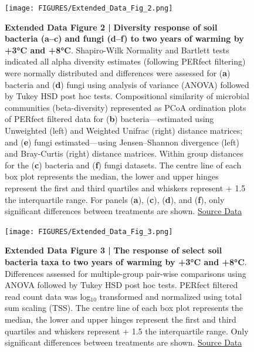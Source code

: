 \documentclass[
  letterpaper,
  DIV=11,
  numbers=noendperiod]{scrartcl}
\begin{document}
\begin{figure}

{\centering \texttt{[image: FIGURES/Extended\_Data\_Fig\_2.png]}

}

\caption{\textbf{Extended Data Figure 2 |}
\textbf{Diversity response of soil bacteria (a--c) and fungi (d--f) to two years of warming by +3°C and +8°C}.
Shapiro-Wilk Normality and Bartlett tests indicated all alpha diversity
estimates (following PERfect filtering) were normally distributed and
differences were assessed for (\textbf{a}) bacteria and (\textbf{d})
fungi using analysis of variance (ANOVA) followed by Tukey HSD post hoc
tests. Compositional similarity of microbial communities
(beta-diversity) represented as PCoA ordination plots of PERfect
filtered data for (\textbf{b}) bacteria---estimated using Unweighted
(left) and Weighted Unifrac (right) distance matrices; and (\textbf{e})
fungi estimated---using Jensen--Shannon divergence (left) and
Bray-Curtis (right) distance matrices. Within group distances for the
(\textbf{c}) bacteria and (\textbf{f}) fungi datasets. The centre line
of each box plot represents the median, the lower and upper hinges
represent the first and third quartiles and whiskers represent + 1.5 the
interquartile range. For panels (\textbf{a}), (\textbf{c}),
(\textbf{d}), and (\textbf{f}), only significant differences between
treatments are shown.
\href{https://doi.org/10.25573/data.20263857}{Source Data}}

\end{figure}

\begin{figure}

{\centering \texttt{[image: FIGURES/Extended\_Data\_Fig\_3.png]}

}

\caption{\textbf{Extended Data Figure 3 |}
\textbf{The response of select soil bacteria taxa to two years of warming by +3°C and +8°C}.
Differences assessed for multiple-group pair-wise comparisons using
ANOVA followed by Tukey HSD post hoc tests. PERfect filtered read count
data was log\(_{10}\) transformed and normalized using total sum scaling
(TSS). The centre line of each box plot represents the median, the lower
and upper hinges represent the first and third quartiles and whiskers
represent + 1.5 the interquartile range. Only significant differences
between treatments are shown.
\href{https://doi.org/10.25573/data.20263857}{Source Data}}

\end{figure}
\end{document}
